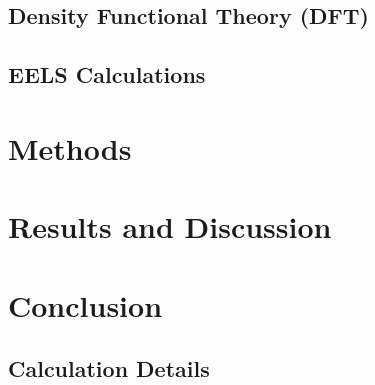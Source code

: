 \documentclass[12pt]{report}
\begin{document}
\section{Density Functional Theory (DFT)}\label{dft_section}

\section{EELS Calculations}\label{ELNES_section}

\chapter{Methods}\label{methods}

\chapter{Results and Discussion}\label{results}

\chapter{Conclusion}\label{conclusion}


\begin{appendices}

\chapter{Calculation Details} \label{calc_details}






\end{appendices}


\newpage




\end{document}
